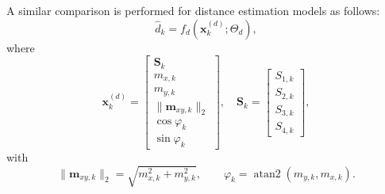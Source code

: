\documentclass[subscriptcorrection,upint,varvw,barcolor=Goldenrod3,mathalfa=cal=euler,balance,hyphenate,pdf-a]{asmejour}
\begin{document}

A similar comparison is performed for distance estimation models as follows:
\begin{equation}
\hat{d}_k = f_d(\mathbf{x}^{(d)}_k;\Theta_d),
\end{equation}
where
\begin{equation*}
\mathbf{x}^{(d)}_k =
\begin{bmatrix}
\mathbf{S}_k \\
m_{x,k} \\ m_{y,k} \\ \|\mathbf{m}_{xy,k}\|_2 \\
\cos\varphi_k \\ \sin\varphi_k
\end{bmatrix},
\quad \mathbf{S}_k = \begin{bmatrix} S_{1,k} \\ S_{2,k} \\ S_{3,k} \\ S_{4,k} \end{bmatrix},
\end{equation*}
with
\begin{equation*}
\|\mathbf{m}_{xy,k}\|_2 = \sqrt{m_{x,k}^2 + m_{y,k}^2},
\qquad
\varphi_k = \operatorname{atan2}(m_{y,k},m_{x,k}).
\end{equation*}
\end{document}
